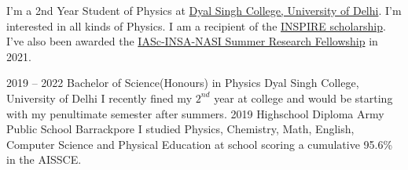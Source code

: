 \documentclass[9pt]{developercv} %
\begin{document}
\vspace{0.5cm}



\begin{minipage}[t]{0.4\textwidth} %
	\vspace{-\baselineskip} %
	
	I’m a 2nd Year Student of Physics at {\href{http://dsc.du.ac.in/}{Dyal Singh College, University of Delhi}}. I’m interested in all kinds of Physics. I am a recipient of the {\href{https://online-inspire.gov.in/}{INSPIRE scholarship}}. I’ve also been awarded the {\href{https://web-japps.ias.ac.in:8443/SEP/SummerFellowships.jsp}{IASc-INSA-NASI Summer Research Fellowship}} in 2021.
\end{minipage}
\hfill %
\begin{minipage}[t]{0.5\textwidth} %
	\vspace{-\baselineskip} %
	\begin{barchart}{5.5}
	\end{barchart}
\end{minipage}




\begin{entrylist}
	

	\entry
		{2019 -- 2022}
		{Bachelor of Science(Honours) in Physics}
		{Dyal Singh College, University of Delhi}
		{I recently fined my $2^{nd}$ year at college and would be starting with my penultimate semester after summers.}
	\entry
		{2019}
		{Highschool Diploma}
		{Army Public School Barrackpore}
		{I studied Physics, Chemistry, Math, English, Computer Science and Physical Education at school scoring a cumulative 95.6\% in the AISSCE.}
\end{entrylist}
\end{document}
